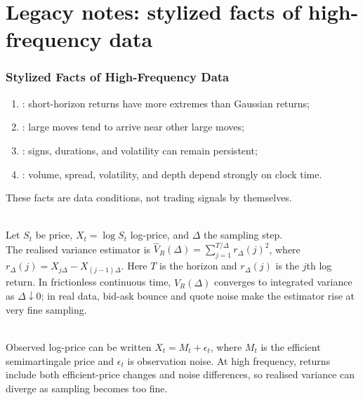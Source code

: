 \documentclass[a4paper,oneside,openany]{book}
\begin{document}
\chapter*{Legacy notes: stylized facts of high-frequency data}

\subsection*{Stylized Facts of High-Frequency Data}

\begin{taxonomy} 
\begin{enumerate}[label=\roman*.]
\setlength{\itemsep}{0pt}
\item {}: short-horizon returns have more extremes than Gaussian returns;
\item {}: large moves tend to arrive near other large moves;
\item {}: signs, durations, and volatility can remain persistent;
\item {}: volume, spread, volatility, and depth depend strongly on clock time.
\end{enumerate}
These facts are data conditions, not trading signals by themselves.
\end{taxonomy}

\begin{model} \\
Let $S_t$ be price, $X_t=\log S_t$ log-price, and $\Delta$ the sampling step.\\
The realised variance estimator is $\hat{V}_R(\Delta)=\sum\limits_{j=1}^{T/\Delta}r_\Delta(j)^2$, where $r_\Delta(j)=X_{j\Delta}-X_{(j-1)\Delta}$. Here $T$ is the horizon and $r_\Delta(j)$ is the $j$th log return. In frictionless continuous time, $\hat{V}_R(\Delta)$ converges to integrated variance as $\Delta\downarrow0$; in real data, bid-ask bounce and quote noise make the estimator rise at very fine sampling.
\end{model}

\begin{mechanism} \\
Observed log-price can be written $X_t=M_t+\epsilon_t$, where $M_t$ is the efficient semimartingale price and $\epsilon_t$ is observation noise. At high frequency, returns include both efficient-price changes and noise differences, so realised variance can diverge as sampling becomes too fine.
\end{mechanism}
\end{document}
